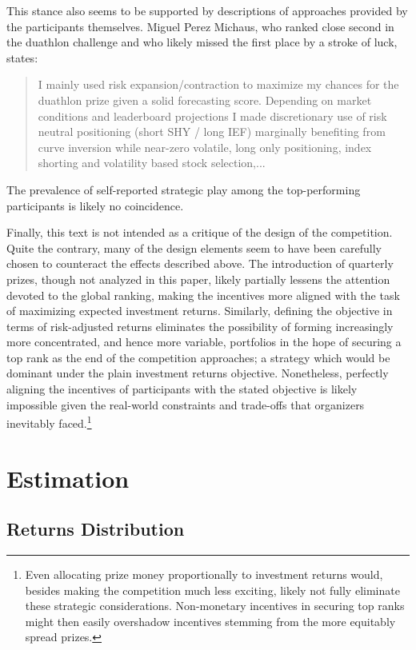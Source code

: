 \documentclass[3p,times,twocolumn]{elsarticle}
\begin{document}
This stance also seems to be supported by descriptions of approaches provided by the participants themselves.
Miguel Perez Michaus, who ranked close second in the duathlon challenge and who likely missed the first place by a stroke of luck, states:
\begin{quote}
    I mainly used risk expansion/contraction to maximize my chances for the duathlon prize given a solid forecasting score.
    Depending on market conditions and leaderboard projections I made discretionary use of risk neutral positioning (short SHY / long IEF) marginally benefiting from curve inversion while near-zero volatile, long only positioning, index shorting and volatility based stock selection,...\citep{michausFinQBoostMachineLearning2023}
\end{quote}
The prevalence of self-reported strategic play among the top-performing participants is likely no coincidence.

Finally, this text is not intended as a critique of the design of the competition.
Quite the contrary, many of the design elements seem to have been carefully chosen to counteract the effects described above.
The introduction of quarterly prizes, though not analyzed in this paper, likely partially lessens the attention devoted to the global ranking, making the incentives more aligned with the task of maximizing expected investment returns.
Similarly, defining the objective in terms of risk-adjusted returns eliminates the possibility of forming increasingly more concentrated, and hence more variable, portfolios in the hope of securing a top rank as the end of the competition approaches; a strategy which would be dominant under the plain investment returns objective.
Nonetheless, perfectly aligning the incentives of participants with the stated objective is likely impossible given the real-world constraints and trade-offs that organizers inevitably faced.\footnote{Even allocating prize money proportionally to investment returns would, besides making the competition much less exciting, likely not fully eliminate these strategic considerations. Non-monetary incentives in securing top ranks might then easily overshadow incentives stemming from the more equitably spread prizes.}

\appendix

\section{Estimation}

\subsection{Returns Distribution}\label{appendix:returns_distribution}
\end{document}
